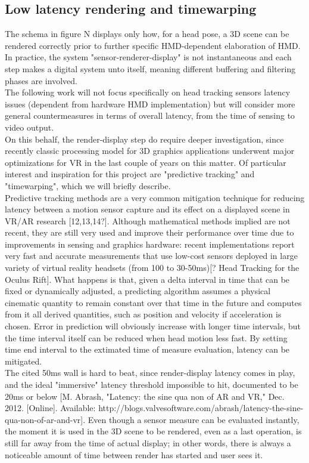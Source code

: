 \subsection{Low latency rendering and timewarping}
The schema in figure N displays only how, for a head pose, a 3D scene can be rendered correctly prior to further specific HMD-dependent elaboration of HMD. In practice, the system "sensor-renderer-display" is not instantaneous and each step makes a digital system unto itself, meaning different buffering and filtering phases are involved.\\
The following work will not focus specifically on head tracking sensors latency issues (dependent from hardware HMD implementation) but will consider more general countermeasures in terms of overall latency, from the time of sensing to video output.\\
On this behalf, the render-display step do require deeper investigation, since recently classic processing model for 3D graphics applications underwent major optimizations for VR in the last couple of years on this matter. Of particular interest and inspiration for this project are "predictive tracking" and "timewarping", which we will briefly describe.\\
Predictive tracking methods are a very common mitigation technique for reducing latency between a motion sensor capture and its effect on a displayed scene in VR/AR research [12,13,14?]. Although mathematical methods implied are not recent, they are still very used and improve their performance over time due to improvements in sensing and graphics hardware: recent implementations report very fast and accurate measurements that use low-cost sensors deployed in large variety of virtual reality headsets (from 100 to 30-50ms)[? Head Tracking for the Oculus Rift]. What happens is that, given a delta interval in time that can be fixed or dynamically adjusted, a predicting algorithm assumes a physical cinematic quantity to remain constant over that time in the future and computes from it all derived quantities, such as position and velocity if acceleration is chosen. Error in prediction will obviously increase with longer time intervals, but the time interval itself can be reduced when head motion less fast. By setting time end interval to the extimated time of measure evaluation, latency can be mitigated.\\
The cited 50ms wall is hard to beat, since render-display latency comes in play, and the ideal "immersive" latency threshold impossible to hit, documented to be 20ms or below [M. Abrash, "Latency: the sine qua non of AR and VR," Dec. 2012. [Online]. Available: http://blogs.valvesoftware.com/abrash/latency-the-sine-qua-non-of-ar-and-vr]. Even though a sensor measure can be evaluated instantly, the moment it is used in the 3D scene to be rendered, even as a last operation, is still far away from the time of actual display; in other words, there is always a noticeable amount of time between render has started and user sees it.

